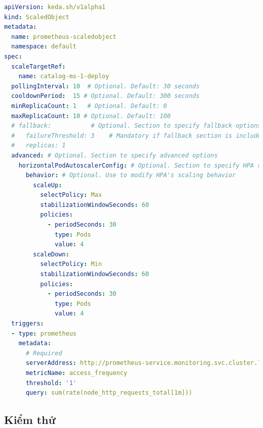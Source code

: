 \begin{lstlisting}[language=yaml]
apiVersion: keda.sh/v1alpha1
kind: ScaledObject
metadata:
  name: prometheus-scaledobject
  namespace: default
spec:
  scaleTargetRef:
    name: catalog-ms-1-deploy
  pollingInterval: 10  # Optional. Default: 30 seconds
  cooldownPeriod:  15 # Optional. Default: 300 seconds
  minReplicaCount: 1   # Optional. Default: 0
  maxReplicaCount: 10 # Optional. Default: 100
  # fallback:           # Optional. Section to specify fallback options
  #   failureThreshold: 3    # Mandatory if fallback section is included
  #   replicas: 1
  advanced: # Optional. Section to specify advanced options
    horizontalPodAutoscalerConfig: # Optional. Section to specify HPA related options
      behavior: # Optional. Use to modify HPA's scaling behavior
        scaleUp:
          selectPolicy: Max
          stabilizationWindowSeconds: 60
          policies:
            - periodSeconds: 30
              type: Pods
              value: 4
        scaleDown:
          selectPolicy: Min
          stabilizationWindowSeconds: 60
          policies:
            - periodSeconds: 30
              type: Pods
              value: 4
  triggers:
  - type: prometheus
    metadata:
      # Required
      serverAddress: http://prometheus-service.monitoring.svc.cluster.local:8080/
      metricName: access_frequency
      threshold: '1'
      query: sum(rate(node_http_requests_total[1m]))
\end{lstlisting}

\subsection{Kiểm thử}
